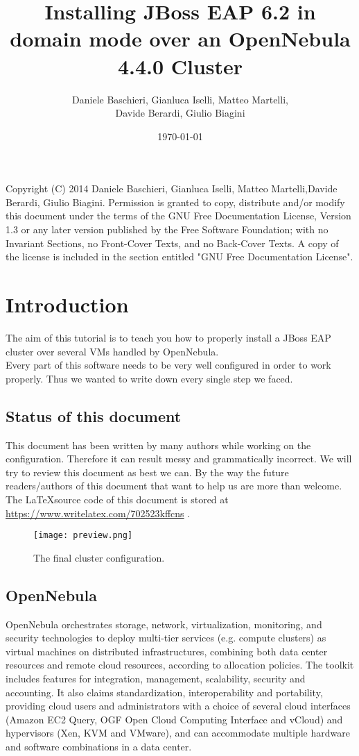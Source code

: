\documentclass[11pt,a4paper]{article}
\title{Installing JBoss EAP 6.2 in domain mode over an OpenNebula 4.4.0 Cluster}
\author{Daniele Baschieri, Gianluca Iselli, Matteo Martelli,\\ Davide Berardi, Giulio Biagini}
\date{\today}
\begin{document}
\maketitle


Copyright (C)  2014  Daniele Baschieri, Gianluca Iselli, Matteo Martelli,Davide Berardi, Giulio Biagini.
    Permission is granted to copy, distribute and/or modify this document
    under the terms of the GNU Free Documentation License, Version 1.3
    or any later version published by the Free Software Foundation;
    with no Invariant Sections, no Front-Cover Texts, and no Back-Cover Texts.
    A copy of the license is included in the section entitled "GNU
    Free Documentation License".

\newpage
\tableofcontents
\listoffigures
\newpage

\section{Introduction}

The aim of this tutorial is to teach you how to properly install a JBoss EAP cluster over several VMs handled by OpenNebula.  \\
Every part of this software needs to be very well configured in order to work properly. Thus we wanted to write down every single step we faced.
\subsection{Status of this document}
This document has been written by many authors while working on the configuration. Therefore it can result messy and grammatically incorrect. We will try to review this document as best we can. By the way the future readers/authors of this document that want to help us are more than welcome. The \LaTeX source code of this document is stored at \url{https://www.writelatex.com/702523kffcns} .

\begin{figure}[ht]
\centering
\texttt{[image: preview.png]}
\caption{\label{fig:preview} The final cluster configuration.}
\end{figure}

\subsection{OpenNebula}
OpenNebula orchestrates storage, network, virtualization, monitoring, and security technologies to deploy multi-tier services (e.g. compute clusters) as virtual machines on distributed infrastructures, combining both data center resources and remote cloud resources, according to allocation policies.
The toolkit includes features for integration, management, scalability, security and accounting. It also claims standardization, interoperability and portability, providing cloud users and administrators with a choice of several cloud interfaces (Amazon EC2 Query, OGF Open Cloud Computing Interface and vCloud) and hypervisors (Xen, KVM and VMware), and can accommodate multiple hardware and software combinations in a data center.\cite{OpenNebulaInfo}
\end{document}
